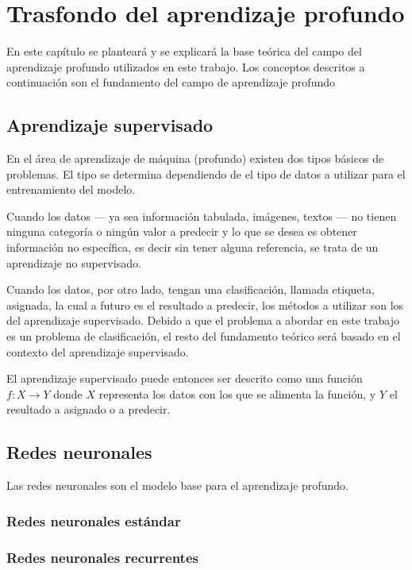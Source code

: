 
\chapter{Trasfondo del aprendizaje profundo} %

\label{Chapter2} %

En este capítulo se planteará y se explicará la base teórica del campo del aprendizaje profundo utilizados en este trabajo. Los conceptos descritos a continuación son el fundamento del campo de aprendizaje profundo


\section{Aprendizaje supervisado}

En el área de aprendizaje de máquina (profundo) existen dos tipos básicos de problemas. El tipo se determina dependiendo de el tipo de datos a utilizar para el entrenamiento del modelo.

Cuando los datos --- ya sea información tabulada, imágenes, textos --- no tienen ninguna categoría o ningún valor a predecir y lo que se desea es obtener información no específica, es decir sin tener alguna referencia, se trata de un aprendizaje no supervisado.

Cuando los datos, por otro lado, tengan una clasificación, llamada etiqueta, asignada, la cual a futuro es el resultado a predecir, los métodos a utilizar son los del aprendizaje supervisado. Debido a que el problema a abordar en este trabajo es un problema de clasificación, el resto del fundamento teórico será basado en el contexto del aprendizaje supervisado.

El aprendizaje supervisado puede entonces ser descrito como una función $f : X \to Y$ donde $X$ representa los datos con los que se alimenta la función, y $Y$ el resultado a asignado o a predecir.

\section{Redes neuronales}

Las redes neuronales son el modelo base para el aprendizaje profundo.

\subsection{Redes neuronales estándar}

\subsection{Redes neuronales recurrentes}